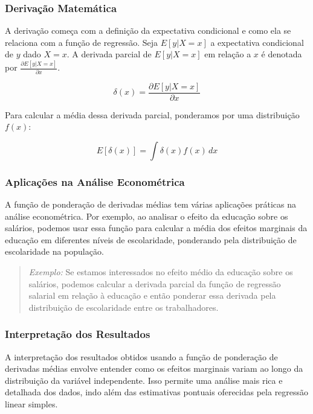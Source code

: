 \documentclass[a4paper,12pt]{article}[abntex2]
\begin{document}
\subsubsection{Derivação Matemática}
A derivação começa com a definição da expectativa condicional e como ela se relaciona com a função de regressão. Seja \( E[y|X=x] \) a expectativa condicional de \( y \) dado \( X=x \). A derivada parcial de \( E[y|X=x] \) em relação a \( x \) é denotada por \( \frac{\partial E[y|X=x]}{\partial x} \).

\begin{equation}
\delta(x) = \frac{\partial E[y|X=x]}{\partial x}
\end{equation}

Para calcular a média dessa derivada parcial, ponderamos por uma distribuição \( f(x) \):

\begin{equation}
E[\delta(x)] = \int \delta(x) f(x) \, dx
\end{equation}

\subsubsection{Aplicações na Análise Econométrica}
A função de ponderação de derivadas médias tem várias aplicações práticas na análise econométrica. Por exemplo, ao analisar o efeito da educação sobre os salários, podemos usar essa função para calcular a média dos efeitos marginais da educação em diferentes níveis de escolaridade, ponderando pela distribuição de escolaridade na população.

\begin{quote}
\textit{Exemplo:} Se estamos interessados no efeito médio da educação sobre os salários, podemos calcular a derivada parcial da função de regressão salarial em relação à educação e então ponderar essa derivada pela distribuição de escolaridade entre os trabalhadores.
\end{quote}

\subsubsection{Interpretação dos Resultados}
A interpretação dos resultados obtidos usando a função de ponderação de derivadas médias envolve entender como os efeitos marginais variam ao longo da distribuição da variável independente. Isso permite uma análise mais rica e detalhada dos dados, indo além das estimativas pontuais oferecidas pela regressão linear simples.
\end{document}
